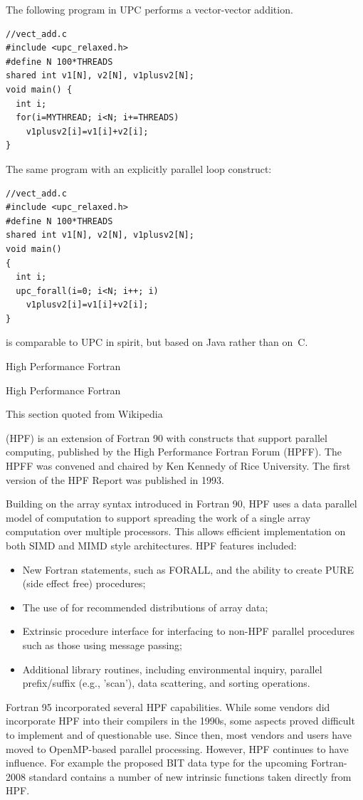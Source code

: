 The following program in \ac{UPC} performs a vector-vector addition.
\begin{verbatim}
//vect_add.c
#include <upc_relaxed.h>
#define N 100*THREADS
shared int v1[N], v2[N], v1plusv2[N];
void main() {
  int i;
  for(i=MYTHREAD; i<N; i+=THREADS)
    v1plusv2[i]=v1[i]+v2[i];
}
\end{verbatim}
The same program with an explicitly parallel loop construct:
\begin{verbatim}
//vect_add.c
#include <upc_relaxed.h>
#define N 100*THREADS
shared int v1[N], v2[N], v1plusv2[N];
void main()
{
  int i;
  upc_forall(i=0; i<N; i++; i)
    v1plusv2[i]=v1[i]+v2[i];
}
\end{verbatim}


 is comparable to \ac{UPC} in spirit, but based on Java rather
than on~C.

 {High Performance Fortran}
\label{sec:HPF}

High Performance Fortran
\begin{footnoteenv}
  {This section quoted from Wikipedia}
\end{footnoteenv}
(HPF) is an extension of Fortran 90 with constructs that support
parallel computing, published by the High Performance Fortran Forum
(HPFF). The HPFF was convened and chaired by Ken Kennedy of Rice
University. The first version of the HPF Report was published in 1993.

Building on the array syntax introduced in Fortran 90, HPF uses a data
parallel model of computation to support spreading the work of a
single array computation over multiple processors. This allows
efficient implementation on both SIMD and MIMD style
architectures. HPF features included:
\begin{itemize}
\item New Fortran statements, such as FORALL, and the ability to
  create PURE (side effect free) procedures;
\item The use of  for recommended
  distributions of array data;
\item Extrinsic procedure interface for interfacing to non-HPF
  parallel procedures such as those using message passing;
\item Additional library routines, including environmental inquiry,
  parallel prefix/suffix (e.g., 'scan'), data scattering, and sorting
  operations.
\end{itemize}
Fortran 95 incorporated several HPF capabilities.  While some vendors
did incorporate HPF into their compilers in the 1990s, some aspects
proved difficult to implement and of questionable use. Since then,
most vendors and users have moved to OpenMP-based parallel
processing. However, HPF continues to have
influence. For example the proposed BIT data type for the upcoming
Fortran-2008 standard contains a number of new intrinsic functions
taken directly from HPF.

